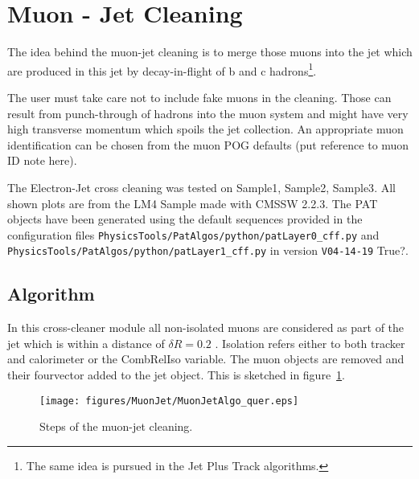 \documentclass{cmspaper}
\begin{document}

\newpage
\section{Muon - Jet Cleaning}
The idea behind the muon-jet cleaning is to merge those muons into the jet which
are produced in this jet by decay-in-flight of b and c hadrons\footnote{The same
idea is pursued in the Jet Plus Track algorithms.}.

The user must take care not to include fake muons in the cleaning. Those can
result from punch-through of hadrons into the muon system and might have very
high transverse momentum which spoils the jet collection. An appropriate muon
identification can be chosen from the muon POG defaults {\color{red}(put reference to muon
ID note here)}.

The Electron-Jet cross cleaning was tested on {\color{red}Sample1, Sample2, Sample3}. All shown plots are from the LM4 Sample made with CMSSW 2.2.3. The PAT objects have been
generated using the default sequences provided in the configuration files
\texttt{PhysicsTools/PatAlgos/python/patLayer0\_cff.py} and
\texttt{PhysicsTools/PatAlgos/python/patLayer1\_cff.py} in version
{\color{red}\texttt{V04-14-19} True?}.
\\


\subsection{Algorithm}
In this cross-cleaner module all non-isolated muons are considered as part of the jet which
is within a distance of $\delta R=0.2$ . Isolation
refers either to both tracker and calorimeter or the CombRelIso variable. The
muon objects are removed and their fourvector added to the jet object. 
This is sketched in figure~\ref{fig:MJCleaning}.

\begin{figure}[hbt]
\begin{center}
\texttt{[image: figures/MuonJet/MuonJetAlgo\_quer.eps]}
\caption{Steps of the muon-jet cleaning.}
\label{fig:MJCleaning}
\end{center}
\end{figure}
\end{document}
